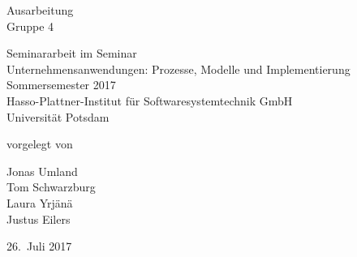 \documentclass[11pt, a4paper]{article}
\begin{document}
          

\begin{titlepage}
  \begin{center} 
    \mbox{}
    \vspace{1cm}
    
    {\huge Ausarbeitung \\[1em] {\LARGE Gruppe 4}}  
        
    \vspace{5cm}
    
    Seminararbeit im Seminar \\[1em]
    {\large \sc Unternehmensanwendungen: Prozesse, Modelle und Implementierung} \\[1em]
    Sommersemester 2017 \\[1em]
    Hasso-Plattner-Institut für Softwaresystemtechnik GmbH \\[1em]
    Universität Potsdam
    
    \vspace{3cm}
    
		vorgelegt von
		
    \vspace{1em}
    
		{\Large Jonas Umland} \\
		{\Large Tom Schwarzburg}\\
		{\Large Laura Yrjänä}\\
		{\Large Justus Eilers}
		
    \vspace{3em}
    
    26.~Juli 2017
  \end{center}
\end{titlepage}


\setcounter{page}{1}



\tableofcontents 

\newpage

 
\newpage

\newpage

\newpage

\newpage



\newpage




\end{document}

